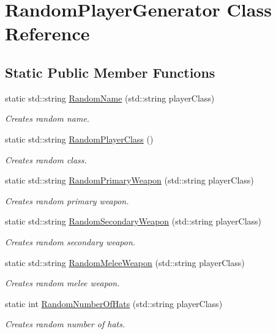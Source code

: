 \hypertarget{class_random_player_generator}{}\section{Random\+Player\+Generator Class Reference}
\label{class_random_player_generator}
\subsection*{Static Public Member Functions}
\begin{DoxyCompactItemize}
\item 
static std\+::string \hyperlink{class_random_player_generator_a77f060ac6cb51407e932c2a3f4fd31b2}{Random\+Name} (std\+::string player\+Class)
\begin{DoxyCompactList}\small\item\em Creates random name. \end{DoxyCompactList}\item 
static std\+::string \hyperlink{class_random_player_generator_a6ef76bd38b842493a68587af8ac5e2ca}{Random\+Player\+Class} ()
\begin{DoxyCompactList}\small\item\em Creates random class. \end{DoxyCompactList}\item 
static std\+::string \hyperlink{class_random_player_generator_a5eaeae37f585247907a1a488112023ff}{Random\+Primary\+Weapon} (std\+::string player\+Class)
\begin{DoxyCompactList}\small\item\em Creates random primary weapon. \end{DoxyCompactList}\item 
static std\+::string \hyperlink{class_random_player_generator_aa87813d47db6d9f7aade0d20646bebe4}{Random\+Secondary\+Weapon} (std\+::string player\+Class)
\begin{DoxyCompactList}\small\item\em Creates random secondary weapon. \end{DoxyCompactList}\item 
static std\+::string \hyperlink{class_random_player_generator_a07240f9eab0983fd9ced58ba19d4af39}{Random\+Melee\+Weapon} (std\+::string player\+Class)
\begin{DoxyCompactList}\small\item\em Creates random melee weapon. \end{DoxyCompactList}\item 
static int \hyperlink{class_random_player_generator_ae5c2055098cfb2b74374bd180b60d003}{Random\+Number\+Of\+Hats} (std\+::string player\+Class)
\begin{DoxyCompactList}\small\item\em Creates random number of hats. \end{DoxyCompactList}\end{DoxyCompactItemize}


